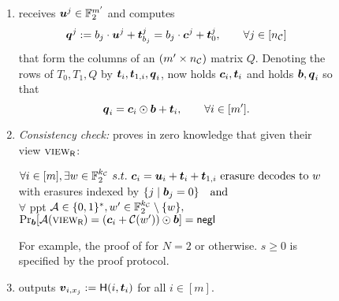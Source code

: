 \begin{figure}[t!]
{\begin{minipage}{0.95\linewidth}
\begin{enumerate}
				\item\label{step:extCompQ} \send receives $\boldsymbol{u}^j\in\mathbb{F}^{m'}_2$ and computes
				$$
				\boldsymbol{q}^j := b_j \cdot \boldsymbol{u}^j +\boldsymbol{t}^j_{b_j} = b_j\cdot \boldsymbol{c}^j+\boldsymbol{t}^j_0,\qquad \forall j\in[{n_\mathcal{C}}]
				$$
				that form the columns of an $(m'\times {n_\mathcal{C}})$ matrix $Q$. Denoting the rows of $T_0,T_1, Q$ by $\boldsymbol{t}_i, \boldsymbol{t}_{1,i},\boldsymbol{q}_i$, \rec now holds $\boldsymbol{c}_i,\boldsymbol{t}_i$ and \send holds $\boldsymbol{b}, \boldsymbol{q}_i$ so that 
				$$
				\boldsymbol{q}_i = \boldsymbol{c}_i\odot \boldsymbol{b}+\boldsymbol{t}_i,\qquad \forall i\in[m'].
				$$
				
				\item \emph{Consistency check:}\label{step:consistency} \rec  proves in zero knowledge that given their view $\textsc{view}_\mathsf{R}$:
				\begin{center}
					$	\forall i\in[m], \exists w\in\mathbb{F}^{{k_\mathcal{C}}}_2\  s.t.\  \boldsymbol{c}_i =\boldsymbol{u}_i+\boldsymbol{t}_i+\boldsymbol{t}_{1,i}  \text{ erasure decodes to } w $\\ 
					{ with erasures indexed by } $\{j \mid \boldsymbol{b}_j = 0 \} \quad  \text{and}$ \\
					$\forall$ ppt $\mathcal{A}\in\{0,1\}^*, w'\in\mathbb{F}^{{k_\mathcal{C}}}_2\setminus\{w\},$ \\
					$\Pr_{\boldsymbol{b}}[\mathcal{A}(\textsc{view}_\mathsf{R})=(\boldsymbol{c}_i+\mathcal{C}(w'))\odot \boldsymbol{b}]=\mathsf{negl}$
				\end{center}
								
				
				 For example, the proof of \cite{C:KelOrsSch15} for $N=2$ or \cite{RSA:OrrOrsSch17} otherwise. $s\geq0$ is specified by the proof protocol.
%					
%					
				\item \rec outputs $\boldsymbol{v}_{i, x_j}:=\mathsf{H}(i,\boldsymbol{t}_i)$ for all $i\in[m]$.
			\end{enumerate}
			

\end{minipage}}
\end{figure}
